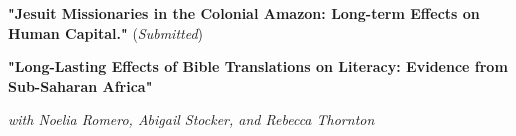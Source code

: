 \documentclass[letterpaper,11pt]{article}
\begin{document}
    \hspace{3mm}
    \textbf{"Jesuit Missionaries in the Colonial Amazon: Long-term Effects on Human Capital."} (\textit{Submitted})
    \vspace{3mm}

    \hspace{3mm}
    \textbf{"Long-Lasting Effects of Bible Translations on Literacy:  Evidence from Sub-Saharan Africa"} 

    \hspace{3mm}
    \textit{with Noelia Romero, Abigail Stocker, and Rebecca Thornton}
    \vspace{3mm}
\end{document}
